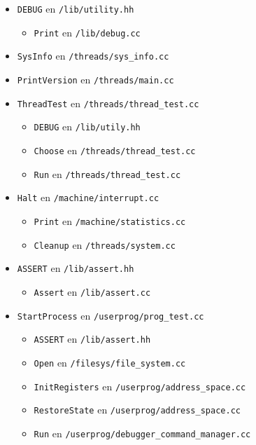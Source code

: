 \documentclass[11pt]{article}
\begin{document}
\begin{enumerate}
\begin{itemize}
\begin{itemize}
        \end{itemize}
    \item \texttt{DEBUG} en \texttt{/lib/utility.hh}
        \begin{itemize}
            \item \texttt{Print} en \texttt{/lib/debug.cc}
        \end{itemize}
    \item \texttt{SysInfo} en \texttt{/threads/sys\_info.cc}
    \item \texttt{PrintVersion} en \texttt{/threads/main.cc}
    \item \texttt{ThreadTest} en \texttt{/threads/thread\_test.cc}
        \begin{itemize}
            \item \texttt{DEBUG} en \texttt{/lib/utily.hh}
            \item \texttt{Choose} en \texttt{/threads/thread\_test.cc}
            \item \texttt{Run} en \texttt{/threads/thread\_test.cc}
        \end{itemize}
    \item \texttt{Halt} en \texttt{/machine/interrupt.cc}
        \begin{itemize}
            \item \texttt{Print} en \texttt{/machine/statistics.cc}
            \item \texttt{Cleanup} en \texttt{/threads/system.cc}
        \end{itemize}
    \item \texttt{ASSERT} en \texttt{/lib/assert.hh}
        \begin{itemize}
            \item \texttt{Assert} en \texttt{/lib/assert.cc}
        \end{itemize}
    \item \texttt{StartProcess} en \texttt{/userprog/prog\_test.cc}
        \begin{itemize}
            \item \texttt{ASSERT} en \texttt{/lib/assert.hh}
            \item \texttt{Open} en \texttt{/filesys/file\_system.cc}
            \item \texttt{InitRegisters} en \texttt{/userprog/address\_space.cc}
            \item \texttt{RestoreState} en \texttt{/userprog/address\_space.cc}
            \item \texttt{Run} en \texttt{/userprog/debugger\_command\_manager.cc}

\end{itemize}
\end{itemize}
\end{enumerate}
\end{document}
